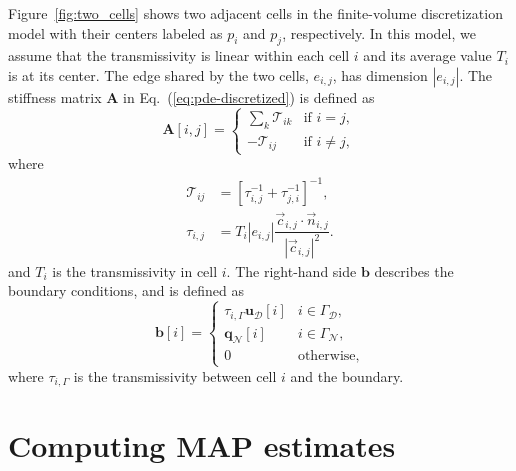 \documentclass{agujournal2019}
\begin{document}
Figure~\ref{fig:two_cells} shows two adjacent cells in the finite-volume discretization model with their centers labeled as $p_i$ and $p_j$, respectively.
In this model, we assume that the transmissivity is linear  
within each cell $i$ and its average value $T_i$ is at its center.
The edge shared by the two cells, $e_{i,j}$, has dimension $|e_{i,j}|$.
The stiffness matrix $\mathbf{A}$ in Eq.~(\ref{eq:pde-discretized}) is defined as
\begin{equation}
    \mathbf{A}[i, j] = \begin{cases}
        \sum_k \mathcal{T}_{ik} &\text{if } i = j,\\
        -\mathcal{T}_{ij} &\text{if } i \ne j,
    \end{cases}
\end{equation}
where
\begin{align*}
    \mathcal{T}_{ij} &= \left[\tau_{i,j}^{-1} + \tau_{j, i}^{-1}\right]^{-1},\\
    \tau_{i, j} &= T_i |e_{i,j}|\dfrac{\vec{c}_{i,j}\cdot\vec{n}_{i,j}}{|\vec{c}_{i,j}|^2}.
\end{align*}
and $T_i$ is the transmissivity in cell $i$.
The right-hand side $\mathbf{b}$ describes the boundary conditions, and is defined as
\begin{equation}
    \label{eq:residual_rhs}
    \mathbf{b}[i] = \begin{cases}
        \tau_{i, \Gamma} \mathbf{u}_\mathcal{D}[i] & i\in\Gamma_\mathcal{D},\\
        \mathbf{q}_\mathcal{N}[i] & i\in\Gamma_\mathcal{N},\\
        0 & \text{otherwise},
    \end{cases}
\end{equation}
where $\tau_{i, \Gamma}$ is the transmissivity between cell $i$ and the boundary.

\section{Computing MAP estimates}\label{MAP}
\end{document}
